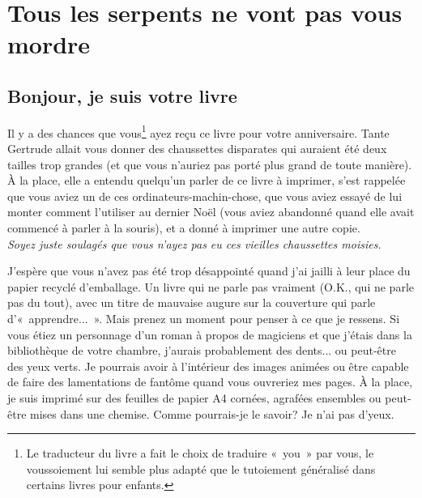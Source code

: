 


\mainmatter
\clearemptydoublepage
\chapter{Tous les serpents ne vont pas vous mor\-dre}
\section{Bonjour, je suis votre livre}
Il y a des chances que vous\footnote{Le traducteur du livre a fait le choix de traduire «~you~» par vous, le voussoiement lui semble plus adapté que le tutoiement généralisé dans certains livres pour enfants.} ayez reçu ce livre pour votre anniversaire. Tante Gertrude allait vous donner des chaussettes disparates qui auraient été deux tailles trop grandes (et que vous n'auriez pas porté plus grand de toute manière). À la place, elle a entendu quelqu'un parler de ce livre à imprimer, s'est rappelée que vous aviez un de ces ordinateurs-machin-chose, que vous aviez essayé de lui monter comment l'utiliser au dernier Noël (vous aviez abandonné quand elle avait commencé à parler à la souris), et a donné à imprimer une autre copie.\\


\emph{Soyez juste soulagés que vous n'ayez pas eu ces vieilles chaussettes moisies.\\}


J'espère que vous n'avez pas été trop désappointé quand j'ai jailli à leur place du papier recyclé d'emballage.
Un livre qui ne parle pas vraiment (O.K., qui ne parle pas du tout), avec un titre de mauvaise augure sur la couverture 
qui parle d'«~apprendre...~». Mais prenez un moment pour penser à ce que je ressens. Si vous étiez un personnage d'un roman à propos de magiciens et que j'étais dans la bibliothèque de votre chambre, j'aurais probablement des dents... ou peut-être des yeux verts. Je pourrais avoir à l'intérieur des images animées ou être capable de faire des lamentations de fantôme quand vous ouvreriez mes pages. À la place, je suis imprimé sur des feuilles de papier A4 cornées, agrafées ensembles ou peut-être mises dans une chemise. Comme pourrais-je le savoir? Je n'ai pas d'yeux.\\


